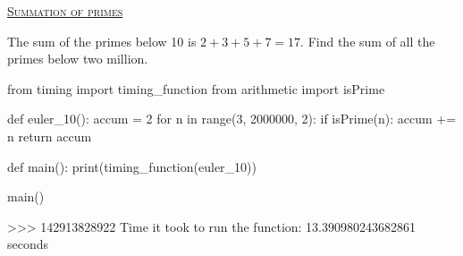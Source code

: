 \documentclass[11pt]{article}
\begin{document}
\par\bigskip \noindent
\href{https://projecteuler.net/problem=10}{\textsc{Summation of primes}}\par\noindent
The sum of the primes below 10 is $2 + 3 + 5 + 7 = 17$.
Find the sum of all the primes below two million.\par\noindent
\begin{code}
from timing import timing_function
from arithmetic import isPrime

def euler_10():
    accum = 2
    for n in range(3, 2000000, 2):
        if isPrime(n):
            accum += n
    return accum

def main():
    print(timing_function(euler_10))

main()
\end{code}
  \begin{shell}
>>> 
142913828922
Time it took to run the function: 13.390980243682861 seconds    
  \end{shell}
\end{document}
